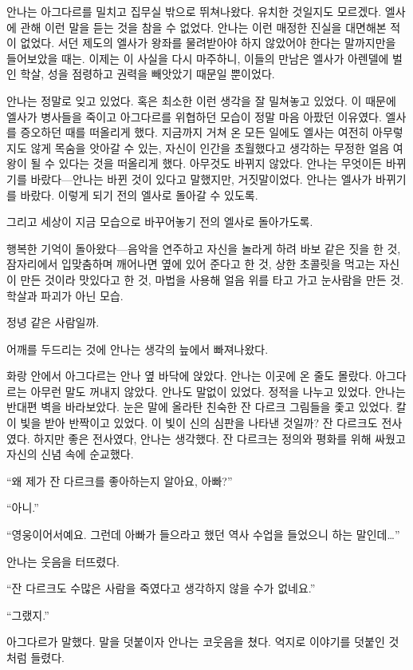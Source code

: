 안나는 아그다르를 밀치고 집무실 밖으로 뛰쳐나왔다. 유치한 것일지도 모르겠다. 엘사에 관해 이런 말을 듣는 것을 참을 수 없었다. 안나는 이런 매정한 진실을 대면해본 적이 없었다. 서던 제도의 엘사가 왕좌를 물려받아야 하지 않았어야 한다는 말까지만을 들어보았을 때는. 이제는 이 사실을 다시 마주하니, 이들의 만남은 엘사가 아렌델에 벌인 학살, 성을 점령하고 권력을 빼앗았기 때문일 뿐이었다.

안나는 정말로 잊고 있었다. 혹은 최소한 이런 생각을 잘 밀쳐놓고 있었다. 이 때문에 엘사가 병사들을 죽이고 아그다르를 위협하던 모습이 정말 마음 아팠던 이유였다. 엘사를 증오하던 때를 떠올리게 했다. 지금까지 거쳐 온 모든 일에도 엘사는 여전히 아무렇지도 않게 목숨을 앗아갈 수 있는, 자신이 인간을 초월했다고 생각하는 무정한 얼음 여왕이 될 수 있다는 것을 떠올리게 했다. 아무것도 바뀌지 않았다. 안나는 무엇이든 바뀌기를 바랐다—안나는 바뀐 것이 있다고 말했지만, 거짓말이었다. 안나는 엘사가 바뀌기를 바랐다. 이렇게 되기 전의 엘사로 돌아갈 수 있도록.

그리고 세상이 지금 모습으로 바꾸어놓기 전의 엘사로 돌아가도록.

행복한 기억이 돌아왔다—음악을 연주하고 자신을 놀라게 하려 바보 같은 짓을 한 것, 잠자리에서 입맞춤하며 깨어나면 옆에 있어 준다고 한 것, 상한 초콜릿을 먹고는 자신이 만든 것이라 맛있다고 한 것, 마법을 사용해 얼음 위를 타고 가고 눈사람을 만든 것. 학살과 파괴가 아닌 모습.

정녕 같은 사람일까.

어깨를 두드리는 것에 안나는 생각의 늪에서 빠져나왔다.

화랑 안에서 아그다르는 안나 옆 바닥에 앉았다. 안나는 이곳에 온 줄도 몰랐다. 아그다르는 아무런 말도 꺼내지 않았다. 안나도 말없이 있었다. 정적을 나누고 있었다. 안나는 반대편 벽을 바라보았다. 눈은 말에 올라탄 친숙한 잔 다르크 그림들을 좇고 있었다. 칼이 빛을 받아 반짝이고 있었다. 이 빛이 신의 심판을 나타낸 것일까? 잔 다르크도 전사였다. 하지만 좋은 전사였다, 안나는 생각했다. 잔 다르크는 정의와 평화를 위해 싸웠고 자신의 신념 속에 순교했다.

``왜 제가 잔 다르크를 좋아하는지 알아요, 아빠?''

``아니.''

``영웅이어서예요. 그런데 아빠가 들으라고 했던 역사 수업을 들었으니 하는 말인데\ldots''

안나는 웃음을 터뜨렸다.

``잔 다르크도 수많은 사람을 죽였다고 생각하지 않을 수가 없네요.''

``그랬지.''

아그다르가 말했다. 말을 덧붙이자 안나는 코웃음을 쳤다. 억지로 이야기를 덧붙인 것처럼 들렸다.

